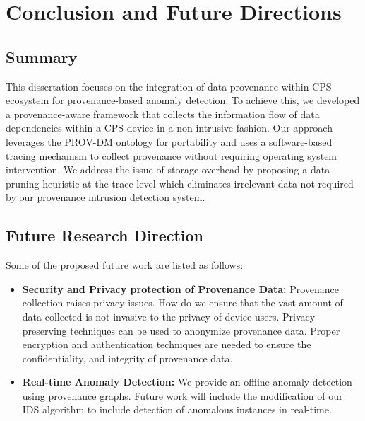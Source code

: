\chapter{Conclusion and Future Directions}


\section{Summary}
This dissertation focuses on the integration of data provenance within CPS ecosystem for provenance-based anomaly detection. To achieve this, we developed a provenance-aware framework that collects the information flow of data dependencies within a CPS device in a non-intrusive fashion. Our approach leverages the PROV-DM ontology for portability and uses a software-based tracing mechanism to collect provenance without requiring operating system intervention. We address the issue of storage overhead by proposing a data pruning heuristic at the trace level which eliminates irrelevant data not required by our provenance intrusion detection system. 



\section{Future Research Direction}

Some of the proposed future work are listed as follows:

\begin{itemize}

\item \textbf{Security and Privacy protection of Provenance Data:} Provenance collection raises privacy issues. How do we ensure that the vast amount of data collected is not invasive to the privacy of device users. Privacy preserving techniques can be used to anonymize provenance data. Proper encryption and authentication techniques \cite{Hasan:2009:CFP:1525908.1525909} are needed to ensure the confidentiality, and integrity of provenance data.

\item \textbf{Real-time Anomaly Detection:} We provide an offline anomaly detection using provenance graphs. Future work will include the modification of our IDS algorithm to include detection of anomalous instances in real-time. 

\end{itemize}

